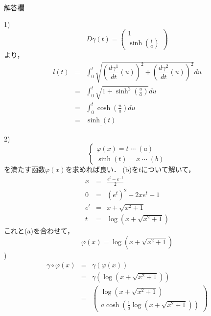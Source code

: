 \documentclass[dvipdfmx,nosetpagesize, uplatex]{jsarticle}
\theoremstyle{definition}
\theoremstyle{StatementsWithStar}
\theoremstyle{StatementsWithStar2}
\theoremstyle{StatementsWithStar3}
\theoremstyle{StatementsWithCCirc}
\theoremstyle{definition}
\begin{document}
\par
%
%
\noindent
解答欄

1) \[ D\gamma (t)= \left(\begin{array}{c}1 \\ \sinh\left(\frac{t}{a}\right) \end{array}\right) \]
より，\begin{eqnarray*}
    l(t)&=& \int^t_0 \sqrt{\left(\dfrac{d\gamma^1}{dt}(u)\right)^2+\left(\dfrac{d\gamma^2}{dt}(u)\right)^2}du\\
    &=& \int^t_0 \sqrt{1+\sinh^2\left(\frac{u}{a}\right)}du \\
    &=& \int^t_0 \cosh\left(\frac{u}{a}\right)du\\
    &=& \underline{\sinh(t)}
\end{eqnarray*}

2) \[ \left\{\begin{array}{c}\varphi(x)=t\;\cdots\; (a) \\ \sinh(t)=x\;\cdots\; (b)\end{array}\right. \]
を満たす函数$\varphi(x)$を求めれば良い．
(b)を$t$について解いて，
\begin{eqnarray*}
    x&=& \frac{e^t-e^{-t}}{2}\\
    0&=& (e^t)^2-2xe^t-1 \\
    e^t &=& x+\sqrt{x^2+1} \\
    t &=& \log\left(x+\sqrt{x^2+1}\right)
\end{eqnarray*}
これと(a)を合わせて，
\[ \underline{\varphi(x)= \log\left(x+\sqrt{x^2+1}\right)}\]
) \begin{eqnarray*}
    \gamma\circ\varphi(x) &=& \gamma(\varphi(x)) \\
    &=& \gamma\left(\log\left(x+\sqrt{x^2+1}\right)\right) \\
    &=& \left(\begin{array}{c}\log\left(x+\sqrt{x^2+1}\right) \\ a\cosh\left( \frac{1}{a}\log\left(x+\sqrt{x^2+1}\right) \right)\end{array}\right)
\end{eqnarray*}
\rightline{$\blacksquare$}
\end{document}
